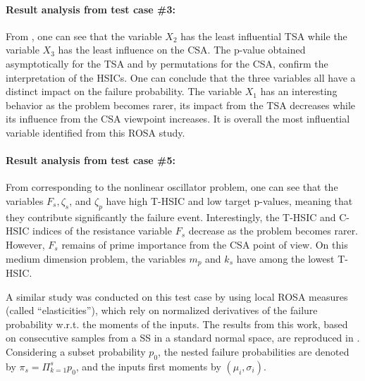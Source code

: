 \paragraph{Result analysis from test case \#3:}

From , one can see that the variable $X_2$ has the least influential TSA while the variable $X_3$ has the least influence on the CSA. 
The p-value obtained asymptotically for the TSA and by permutations for the CSA, confirm the interpretation of the HSICs. 
One can conclude that the three variables all have a distinct impact on the failure probability. 
The variable $X_1$ has an interesting behavior as the problem becomes rarer, its impact from the TSA decreases while its influence from the CSA viewpoint increases.      
It is overall the most influential variable identified from this ROSA study.  

\paragraph{Result analysis from test case \#5:}
From  corresponding to the nonlinear oscillator problem, one can see that the variables $F_s, \zeta_s$, and $\zeta_p$ have high T-HSIC and low target p-values, meaning that they contribute significantly the failure event.    
Interestingly, the T-HSIC and C-HSIC indices of the resistance variable $F_s$ decrease as the problem becomes rarer. 
However, $F_s$ remains of prime importance from the CSA point of view. 
On this medium dimension problem, the variables $m_p$ and $k_s$ have among the lowest T-HSIC. 

A similar study was conducted on this test case by \citet[Subsec. I-4.3.2]{bourinet_2018} using local ROSA measures (called ``elasticities''), which rely on normalized derivatives of the failure probability w.r.t. the moments of the inputs. 
The results from this work, based on consecutive samples from a SS in a standard normal space, are reproduced in . 
Considering a subset probability $p_0$, the nested failure probabilities are denoted by $\pi_s = \Pi_{k=1}^s p_0$, and the inputs first moments by $(\mu_i, \sigma_i)$. 

